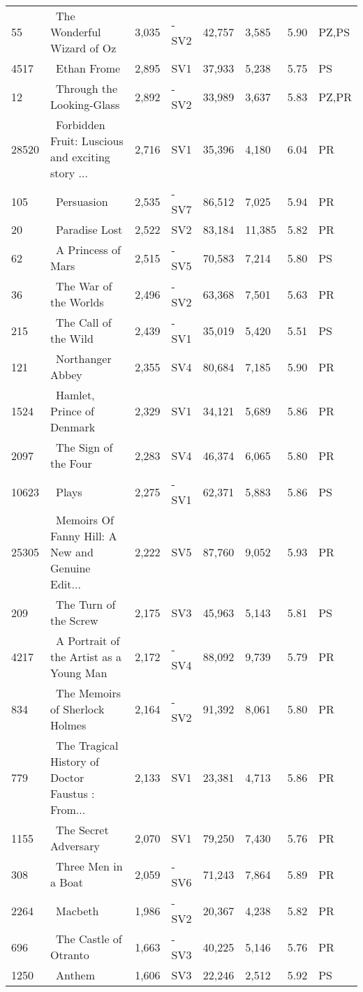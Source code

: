 \begin{longtable}{l | l | l | l | l | l | l | l}
55 & ~The Wonderful Wizard of Oz & 3,035 & -SV2 & 42,757 & 3,585 & 5.90 & PZ,PS\\
4517 & ~Ethan Frome & 2,895 & SV1 & 37,933 & 5,238 & 5.75 & PS\\
12 & ~Through the Looking-Glass & 2,892 & -SV2 & 33,989 & 3,637 & 5.83 & PZ,PR\\
28520 & ~Forbidden Fruit: Luscious and exciting story ... & 2,716 & SV1 & 35,396 & 4,180 & 6.04 & PR\\
105 & ~Persuasion & 2,535 & -SV7 & 86,512 & 7,025 & 5.94 & PR\\
20 & ~Paradise Lost & 2,522 & SV2 & 83,184 & 11,385 & 5.82 & PR\\
62 & ~A Princess of Mars & 2,515 & -SV5 & 70,583 & 7,214 & 5.80 & PS\\
36 & ~The War of the Worlds & 2,496 & -SV2 & 63,368 & 7,501 & 5.63 & PR\\
215 & ~The Call of the Wild & 2,439 & -SV1 & 35,019 & 5,420 & 5.51 & PS\\
121 & ~Northanger Abbey & 2,355 & SV4 & 80,684 & 7,185 & 5.90 & PR\\
1524 & ~Hamlet, Prince of Denmark & 2,329 & SV1 & 34,121 & 5,689 & 5.86 & PR\\
2097 & ~The Sign of the Four & 2,283 & SV4 & 46,374 & 6,065 & 5.80 & PR\\
10623 & ~Plays & 2,275 & -SV1 & 62,371 & 5,883 & 5.86 & PS\\
25305 & ~Memoirs Of Fanny Hill: A New and Genuine Edit... & 2,222 & SV5 & 87,760 & 9,052 & 5.93 & PR\\
209 & ~The Turn of the Screw & 2,175 & SV3 & 45,963 & 5,143 & 5.81 & PS\\
4217 & ~A Portrait of the Artist as a Young Man & 2,172 & -SV4 & 88,092 & 9,739 & 5.79 & PR\\
834 & ~The Memoirs of Sherlock Holmes & 2,164 & -SV2 & 91,392 & 8,061 & 5.80 & PR\\
779 & ~The Tragical History of Doctor Faustus
: From... & 2,133 & SV1 & 23,381 & 4,713 & 5.86 & PR\\
1155 & ~The Secret Adversary & 2,070 & SV1 & 79,250 & 7,430 & 5.76 & PR\\
308 & ~Three Men in a Boat & 2,059 & -SV6 & 71,243 & 7,864 & 5.89 & PR\\
2264 & ~Macbeth & 1,986 & -SV2 & 20,367 & 4,238 & 5.82 & PR\\
696 & ~The Castle of Otranto & 1,663 & -SV3 & 40,225 & 5,146 & 5.76 & PR\\
1250 & ~Anthem & 1,606 & SV3 & 22,246 & 2,512 & 5.92 & PS\\

\end{longtable}

